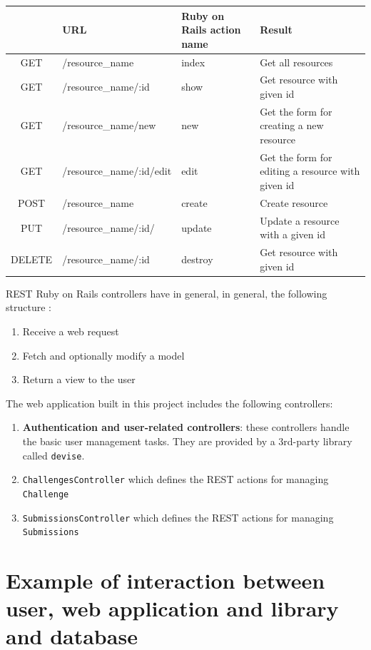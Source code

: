 \begin{tabularx}{\textwidth}{|c|Y|X|X|}
    \hline
    & \textbf{URL} & \textbf{Ruby on Rails action name} & \textbf{Result} \\\hline
    \endhead
    GET & /resource\_name & index & Get all resources \\\hline
    GET & /resource\_name/:id & show & Get resource with given id \\\hline
    GET & /resource\_name/new & new & Get the form for creating a new resource \\\hline
    GET & /resource\_name/:id/edit & edit & Get the form for editing a resource with given id \\\hline
    POST & /resource\_name & create & Create resource \\\hline
    PUT & /resource\_name/:id/ & update & Update a resource with a given id \\\hline
    DELETE & /resource\_name/:id & destroy & Get resource with given id \\\hline
\end{tabularx}

REST Ruby on Rails controllers have in general, in general, the following structure \citep{RoRDocumentation}:
\begin{enumerate}
    \item Receive a web request
    \item Fetch and optionally modify a model
    \item Return a view to the user
\end{enumerate}

The web application built in this project includes the following controllers:
\begin{enumerate}
    \item \textbf{Authentication and user-related controllers}: these controllers handle the basic user management tasks. They are provided by a 3rd-party library called \texttt{devise}.
    \item \texttt{ChallengesController} which defines the REST actions for managing \texttt{Challenge}
    \item \texttt{SubmissionsController} which defines the REST actions for managing \texttt{Submissions}

\end{enumerate}

\section{Example of interaction between user, web application and library and database}

